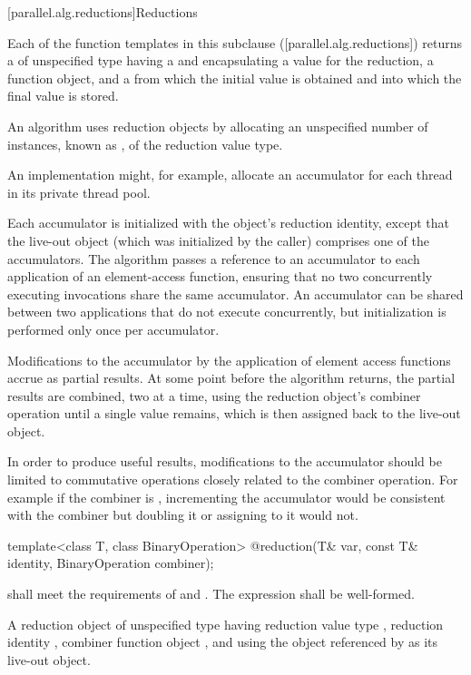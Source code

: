 [parallel.alg.reductions]{Reductions}

\pnum Each of the function templates in this subclause
([parallel.alg.reductions]) returns a  of unspecified type
having a  and encapsulating a  value for
the reduction, a  function object, and a  from which the
initial value is obtained and into which the final value is stored.

\pnum An algorithm uses reduction objects by allocating an unspecified number
of instances, known as , of the reduction value type. \begin{note}An
implementation might, for example, allocate an accumulator for each thread in
its private thread pool.\end{note} Each accumulator is initialized with the
object's reduction identity, except that the live-out object (which was
    initialized by the caller) comprises one of the accumulators. The algorithm
passes a reference to an accumulator to each application of an element-access
function, ensuring that no two concurrently executing invocations share the
same accumulator. An accumulator can be shared between two applications that do
not execute concurrently, but initialization is performed only once per
accumulator.

\pnum Modifications to the accumulator by the application of element access
functions accrue as partial results. At some point before the algorithm
returns, the partial results are combined, two at a time, using the reduction
object's combiner operation until a single value remains, which is then
assigned back to the live-out object. \begin{note}In order to produce useful
results, modifications to the accumulator should be limited to commutative
operations closely related to the combiner operation. For example if the
combiner is , incrementing the accumulator would be consistent with the
combiner but doubling it or assigning to it would not.\end{note}

\begin{itemdecl}
template<class T, class BinaryOperation>
  @\unspec@ reduction(T& var, const T& identity, BinaryOperation combiner);
\end{itemdecl}

\begin{itemdescr}
  \pnum \requires {} shall meet the requirements of  and . The expression  shall be well-formed.

  \pnum \returns A reduction object of unspecified type having reduction value type , reduction identity , combiner function object , and using the object referenced by  as its live-out object.
\end{itemdescr}

